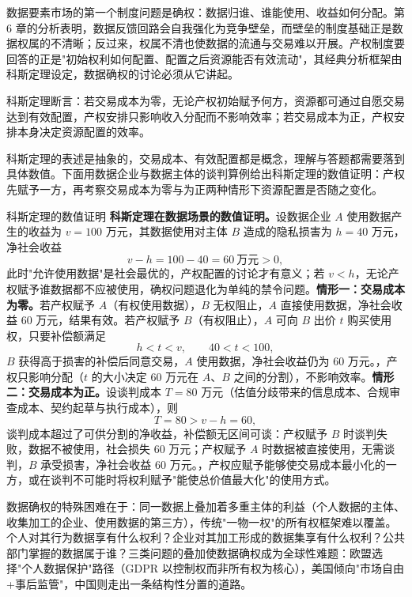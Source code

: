 数据要素市场的第一个制度问题是确权：数据归谁、谁能使用、收益如何分配。第 6 章的分析表明，数据反馈回路会自我强化为竞争壁垒，而壁垒的制度基础正是数据权属的不清晰；反过来，权属不清也使数据的流通与交易难以开展。产权制度要回答的正是"初始权利如何配置、配置之后资源能否有效流动"，其经典分析框架由科斯定理设定，数据确权的讨论必须从它讲起。

\begin{definition}
科斯定理断言：若交易成本为零，无论产权初始赋予何方，资源都可通过自愿交易达到有效配置，产权安排只影响收入分配而不影响效率；若交易成本为正，产权安排本身决定资源配置的效率。
\end{definition}

科斯定理的表述是抽象的，交易成本、有效配置都是概念，理解与答题都需要落到具体数值。下面用数据企业与数据主体的谈判算例给出科斯定理的数值证明：产权先赋予一方，再考察交易成本为零与为正两种情形下资源配置是否随之变化。

\begin{derivation}{科斯定理的数值证明}{}
\textbf{科斯定理在数据场景的数值证明。}设数据企业 $A$ 使用数据产生的收益为 $v = 100$ 万元，其数据使用对主体 $B$ 造成的隐私损害为 $h = 40$ 万元，净社会收益
\[
v - h = 100 - 40 = 60\ \text{万元} > 0,
\]
此时"允许使用数据"是社会最优的，产权配置的讨论才有意义；若 $v < h$，无论产权赋予谁数据都不应被使用，确权问题退化为单纯的禁令问题。\textbf{情形一：交易成本为零。}若产权赋予 $A$（有权使用数据），$B$ 无权阻止，$A$ 直接使用数据，净社会收益 $60$ 万元，结果有效。若产权赋予 $B$（有权阻止），$A$ 可向 $B$ 出价 $t$ 购买使用权，只要补偿额满足
\[
h < t < v, \qquad 40 < t < 100,
\]
$B$ 获得高于损害的补偿后同意交易，$A$ 使用数据，净社会收益仍为 $60$ 万元。，产权只影响分配（$t$ 的大小决定 60 万元在 $A$、$B$ 之间的分割），不影响效率。\textbf{情形二：交易成本为正。}设谈判成本 $T = 80$ 万元（估值分歧带来的信息成本、合规审查成本、契约起草与执行成本），则
\[
T = 80 > v - h = 60,
\]
谈判成本超过了可供分割的净收益，补偿额无区间可谈：产权赋予 $B$ 时谈判失败，数据不被使用，社会损失 $60$ 万元；产权赋予 $A$ 时数据被直接使用，无需谈判，$B$ 承受损害，净社会收益 $60$ 万元。，产权应赋予能够使交易成本最小化的一方，或在谈判不可能时将权利赋予"能使总价值最大化"的使用方式。
\end{derivation}

数据确权的特殊困难在于：同一数据上叠加着多重主体的利益（个人数据的主体、收集加工的企业、使用数据的第三方），传统"一物一权"的所有权框架难以覆盖。个人对其行为数据享有什么权利？企业对其加工形成的数据集享有什么权利？公共部门掌握的数据属于谁？三类问题的叠加使数据确权成为全球性难题：欧盟选择"个人数据保护"路径（GDPR 以控制权而非所有权为核心），美国倾向"市场自由+事后监管"，中国则走出一条结构性分置的道路。


